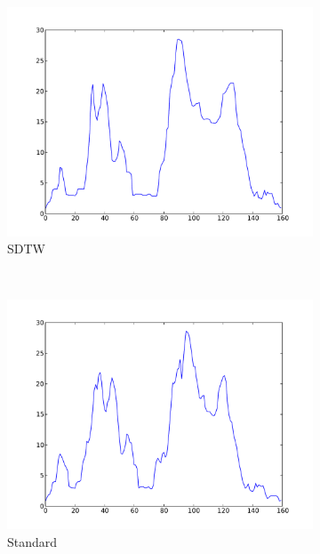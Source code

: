 \documentclass[parskip]{cs4rep}
\begin{document}
\begin{figure}
    ~
    \begin{subfigure}[b]{0.31\textwidth}
        \centering
        \includegraphics[width=\textwidth]{figures/clustering/prototypes/psa.pdf}
        \caption{SDTW}
        \label{fig:clustering:prototypes:sdtw}
    \end{subfigure}
    ~
    \begin{subfigure}[b]{0.31\textwidth}
        \centering
        \includegraphics[width=\textwidth]{figures/clustering/prototypes/std.pdf}
        \caption{Standard}
        \label{fig:clustering:prototypes:std}
    \end{subfigure}
    ~
    \begin{subfigure}[b]{0.31\textwidth}
        \centering

\end{subfigure}
\end{figure}
\end{document}
